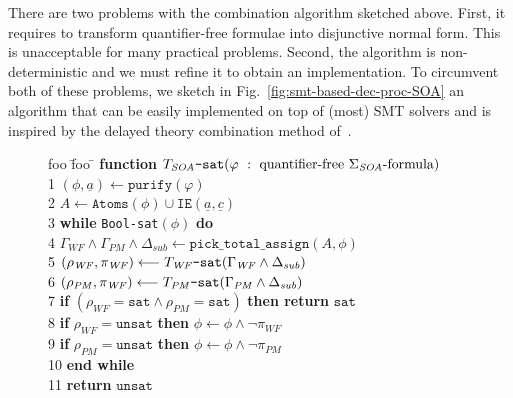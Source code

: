 \documentclass[conference]{IEEEtran}
\begin{document}
\begin{LONG}
There are two problems with the combination algorithm sketched above.
First, it requires to transform quantifier-free formulae into
disjunctive normal form.  This is unacceptable for many practical
problems.  Second, the algorithm is non-deterministic and we must
refine it to obtain an implementation.  To circumvent both of these
problems, we sketch in Fig.~\ref{fig:smt-based-dec-proc-SOA} an
algorithm that can be easily implemented on top of (most) SMT solvers
and is inspired by the delayed theory combination method
of~\cite{delayed-ic}.
\begin{figure}[tb]
  \begin{center}
  \begin{minipage}{.45\textwidth}
      \begin{tabbing}
        foo \= foo \= \kill
        \textbf{function} $T_\mathit{SOA}\mbox{\texttt{-sat}}(\varphi ~:~ \mbox{quantifier-free}~\Sigma_\mathit{SOA}\mbox{-formula})$ \\
        1 \> $(\phi, \underline{a}) \longleftarrow \mathtt{purify}(\varphi)$  \\
        2 \> $A \longleftarrow \mathtt{Atoms}(\phi)\cup \mathtt{IE}(\underline{a},\underline{c})$ \\
        3\> \textbf{while} \texttt{Bool-sat}$(\phi)$ \textbf{do}\\
        4\>\> $\Gamma_\mathit{WF} \wedge \Gamma_\mathit{PM} \wedge \Delta_\mathit{sub} \longleftarrow \mathtt{pick\_total\_assign}(A, \phi)$ \\
        5\>\> $(\rho_\mathit{WF}, \pi_\mathit{WF}) \longleftarrow T_\mathit{WF}\mbox{\texttt{-sat}}(\Gamma_\mathit{WF} \wedge \Delta_\mathit{sub})$ \\
        6\>\> $(\rho_\mathit{PM}, \pi_\mathit{WF}) \longleftarrow T_\mathit{PM}\mbox{\texttt{-sat}}(\Gamma_\mathit{PM} \wedge \Delta_\mathit{sub})$ \\
        7\>\> \textbf{if} $(\rho_\mathit{WF} = \mathtt{sat} \wedge \rho_\mathit{PM} = \mathtt{sat})$ \textbf{then return} $\mathtt{sat}$ \\
        8\>\> \textbf{if} $\rho_\mathit{WF} = \mathtt{unsat}$ \textbf{then} $\phi \longleftarrow \phi \wedge \neg \pi_\mathit{WF}$ \\
        9\>\> \textbf{if} $\rho_\mathit{PM} = \mathtt{unsat}$ \textbf{then} $\phi \longleftarrow \phi \wedge \neg \pi_\mathit{PM}$ \\
        10\> \textbf{end while} \\
        11\> \textbf{return} $\mathtt{unsat}$ \\

\end{tabbing}
\end{minipage}
\end{center}
\end{figure}
\end{LONG}
\end{document}
